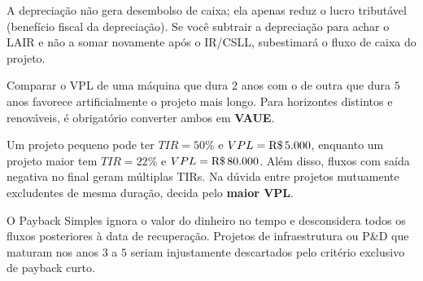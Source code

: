 
\begin{boxErro}
A depreciação não gera desembolso de caixa; ela apenas reduz o lucro tributável (benefício fiscal da depreciação). Se você subtrair a depreciação para achar o LAIR e não a somar novamente após o IR/CSLL, subestimará o fluxo de caixa do projeto.
\end{boxErro}

\begin{boxErro}
Comparar o VPL de uma máquina que dura $2$ anos com o de outra que dura $5$ anos favorece artificialmente o projeto mais longo. Para horizontes distintos e renováveis, é obrigatório converter ambos em \textbf{VAUE}.
\end{boxErro}

\begin{boxErro}
Um projeto pequeno pode ter $TIR = 50\%$ e $VPL = \text{R\$\,}{5.000}$, enquanto um projeto maior tem $TIR = 22\%$ e $VPL = \text{R\$\,}{80.000}$. Além disso, fluxos com saída negativa no final geram múltiplas TIRs. Na dúvida entre projetos mutuamente excludentes de mesma duração, decida pelo \textbf{maior VPL}.
\end{boxErro}

\begin{boxErro}
O Payback Simples ignora o valor do dinheiro no tempo e desconsidera todos os fluxos posteriores à data de recuperação. Projetos de infraestrutura ou P\&D que maturam nos anos $3$ a $5$ seriam injustamente descartados pelo critério exclusivo de payback curto.
\end{boxErro}


